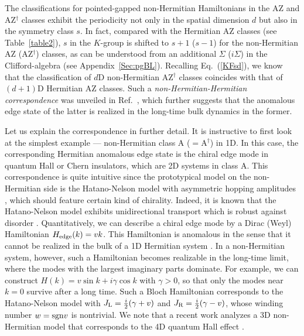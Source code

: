 \documentclass{tADP2e}
\theoremstyle{plain}
\theoremstyle{plain}
\theoremstyle{definition}
\begin{document}
The classifications for pointed-gapped non-Hermitian Hamiltonians in the AZ and AZ$^\dag$ classes exhibit the periodicity  not only in the spatial dimension $d$ but also in the symmetry class $s$. In fact, compared with the Hermitian AZ classes (see Table~\ref{table2}), $s$ in the $K$-group is shifted to $s+1$ ($s-1$) for the non-Hermitian AZ (AZ$^\dag$) classes, as can be understood from an additional $\Sigma$ ($i\Sigma$) in the Clifford-algebra (see Appendix~\ref{Sec:pgBL}). Recalling Eq.~(\ref{KFsd}), we know that the classification of $d$D non-Hermitian AZ$^\dag$ classes coincides with that of  $(d+1)$D Hermitian AZ classes. Such a \emph{non-Hermitian-Hermitian correspondence} was unveiled in Ref.~\cite{JYL19}, which further suggests that the anomalous edge state of the latter is realized in the long-time bulk dynamics in the former. 

Let us explain the correspondence in further detail. It is instructive to first look at the simplest example --- non-Hermitian class A ($=$A$^\dag$) in 1D. In this case, the corresponding Hermitian anomalous edge state is the chiral edge mode in quantum Hall or Chern insulators, which are 2D systems in class A. This correspondence is quite intuitive since the prototypical model on the non-Hermitian side is the Hatano-Nelson model with asymmetric hopping amplitudes \cite{HN96}, which should feature certain kind of chirality. Indeed, it is known that the Hatano-Nelson model exhibits unidirectional transport which is robust against disorder \cite{LS15}. Quantitatively, we can describe a chiral edge mode by a Dirac (Weyl) Hamiltonian $H_{\rm edge}(k)=vk$. This Hamiltonian is anomalous in the sense that it cannot be realized in the bulk of a 1D Hermitian system \cite{HBN81b}. In a non-Hermitian system, however, such a Hamiltonian becomes realizable in the long-time limit, where the modes with the largest imaginary parts dominate. For example, we can construct $H(k)=v\sin k+i\gamma\cos k$ with $\gamma>0$, so that only the modes near $k=0$ survive after a long time. 
Such a Bloch Hamiltonian corresponds to the Hatano-Nelson model with $J_{\rm L}=\frac{i}{2}(\gamma+v)$ and $J_{\rm R}=\frac{i}{2}(\gamma-v)$, whose winding number $w={\rm sgn} v$ is nontrivial. We note that a recent work analyzes a 3D non-Hermitian model that corresponds to the 4D quantum Hall effect \cite{FKK20}. 
\end{document}
